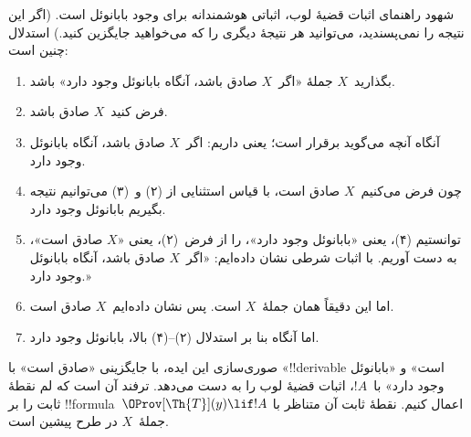 \documentclass[../../../include/open-logic-section]{subfiles}
\begin{document}
\begin{explain}
شهود راهنمای اثبات قضیهٔ لوب، اثباتی هوشمندانه برای وجود بابانوئل است.
(اگر این نتیجه را نمی‌پسندید، می‌توانید هر نتیجهٔ دیگری را که می‌خواهید
جایگزین کنید.) استدلال چنین است:
\begin{enumerate}
\item بگذارید~$X$ جملهٔ «اگر~$X$ صادق باشد، آنگاه بابانوئل وجود دارد»
  باشد.
\item فرض کنید~$X$ صادق باشد.
\item آنگاه آنچه می‌گوید برقرار است؛ یعنی داریم: اگر~$X$ صادق باشد،
  آنگاه بابانوئل وجود دارد.
\item چون فرض می‌کنیم~$X$ صادق است، با قیاس استثنایی از (۲) و~(۳)
  می‌توانیم نتیجه بگیریم بابانوئل وجود دارد.
\item توانستیم (۴)، یعنی «بابانوئل وجود دارد»، را از فرض~(۲)، یعنی
  «$X$ صادق است»، به دست آوریم. با اثبات شرطی نشان داده‌ایم: «اگر~$X$
  صادق باشد، آنگاه بابانوئل وجود دارد.»
\item اما این دقیقاً همان جملهٔ~$X$ است. پس نشان داده‌ایم~$X$ صادق است.
\item اما آنگاه بنا بر استدلال (۲)--(۴) بالا، بابانوئل وجود دارد.
\end{enumerate}
صوری‌سازی این ایده، با جایگزینی «صادق است» با «!!{derivable} است» و
«بابانوئل وجود دارد» با~$!A$، اثبات قضیهٔ لوب را به دست می‌دهد. ترفند
آن است که لم نقطهٔ ثابت را بر !!{formula}~$\OProv[\Th{T}](y) \lif !A$
اعمال کنیم. نقطهٔ ثابت آن متناظر با جملهٔ~$X$ در طرح پیشین است.
\end{explain}
\end{document}
